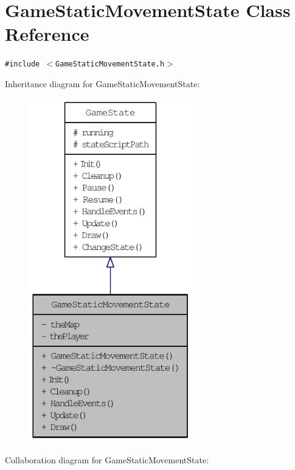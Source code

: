 \hypertarget{class_game_static_movement_state}{
\section{GameStaticMovementState Class Reference}
\label{d7/d3b/class_game_static_movement_state}
}
{\tt \#include $<$GameStaticMovementState.h$>$}

Inheritance diagram for GameStaticMovementState:\nopagebreak
\begin{figure}[H]
\begin{center}
\leavevmode
\includegraphics[width=200pt]{d0/d7e/class_game_static_movement_state__inherit__graph}
\end{center}
\end{figure}
Collaboration diagram for GameStaticMovementState:\nopagebreak
